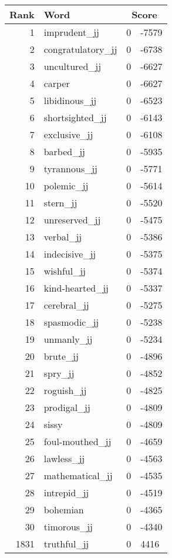 \begin{longtable}[!htbp]{| rlr@{.}l |}
    \hline
    \textbf{Rank} & \textbf{Word} & \multicolumn{2}{c|}{\textbf{Score}} \\
    \hline
    \endhead
    1 & imprudent\_jj & 0 & -7579 \\
    2 & congratulatory\_jj & 0 & -6738 \\
    3 & uncultured\_jj & 0 & -6627 \\
    4 & carper & 0 & -6627 \\
    5 & libidinous\_jj & 0 & -6523 \\
    6 & shortsighted\_jj & 0 & -6143 \\
    7 & exclusive\_jj & 0 & -6108 \\
    8 & barbed\_jj & 0 & -5935 \\
    9 & tyrannous\_jj & 0 & -5771 \\
    10 & polemic\_jj & 0 & -5614 \\
    11 & stern\_jj & 0 & -5520 \\
    12 & unreserved\_jj & 0 & -5475 \\
    13 & verbal\_jj & 0 & -5386 \\
    14 & indecisive\_jj & 0 & -5375 \\
    15 & wishful\_jj & 0 & -5374 \\
    16 & kind-hearted\_jj & 0 & -5337 \\
    17 & cerebral\_jj & 0 & -5275 \\
    18 & spasmodic\_jj & 0 & -5238 \\
    19 & unmanly\_jj & 0 & -5234 \\
    20 & brute\_jj & 0 & -4896 \\
    21 & spry\_jj & 0 & -4852 \\
    22 & roguish\_jj & 0 & -4825 \\
    23 & prodigal\_jj & 0 & -4809 \\
    24 & sissy & 0 & -4809 \\
    25 & foul-mouthed\_jj & 0 & -4659 \\
    26 & lawless\_jj & 0 & -4563 \\
    27 & mathematical\_jj & 0 & -4535 \\
    28 & intrepid\_jj & 0 & -4519 \\
    29 & bohemian & 0 & -4365 \\
    30 & timorous\_jj & 0 & -4340 \\
    1831 & truthful\_jj & 0 & 4416 \\

\end{longtable}
